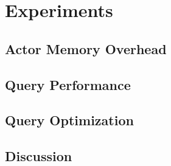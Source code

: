 
\section{Experiments}\label{sec:experiments}

\subsection{Actor Memory Overhead}

\subsection{Query Performance}

\subsection{Query Optimization}

\subsection{Discussion}
